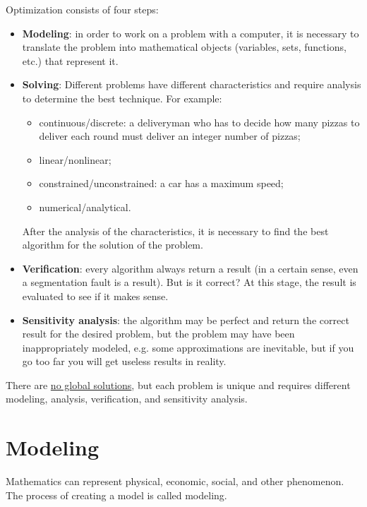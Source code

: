 Optimization consists of four steps:
\begin{itemize}
    \item \textbf{Modeling}: in order to work on a problem with a computer, it is necessary to translate the problem into mathematical objects (variables, sets, functions, etc.) that represent it.
    
    \item \textbf{Solving}: Different problems have different characteristics and require analysis to determine the best technique. For example: 
    \begin{itemize}
        \item continuous/discrete: a deliveryman who has to decide how many pizzas to deliver each round must deliver an integer number of pizzas;
        \item linear/nonlinear;
        \item constrained/unconstrained: a car has a maximum speed;
        \item numerical/analytical. 
    \end{itemize}
    After the analysis of the characteristics, it is necessary to find the best algorithm for the solution of the problem.

    \item \textbf{Verification}: every algorithm always return a result (in a certain sense, even a segmentation fault is a result). But is it correct? At this stage, the result is evaluated to see if it makes sense.
    
    \item \textbf{Sensitivity analysis}: the algorithm may be perfect and return the correct result for the desired problem, but the problem may have been inappropriately modeled, e.g. some approximations are inevitable, but if you go too far you will get useless results in reality.
\end{itemize}

There are \underline{no global solutions}, but each problem is unique and requires different modeling, analysis, verification, and sensitivity analysis.

\section{Modeling}
\label{sec:introduction.modeling}

Mathematics can represent physical, economic, social, and other phenomenon. The process of creating a model is called modeling.

